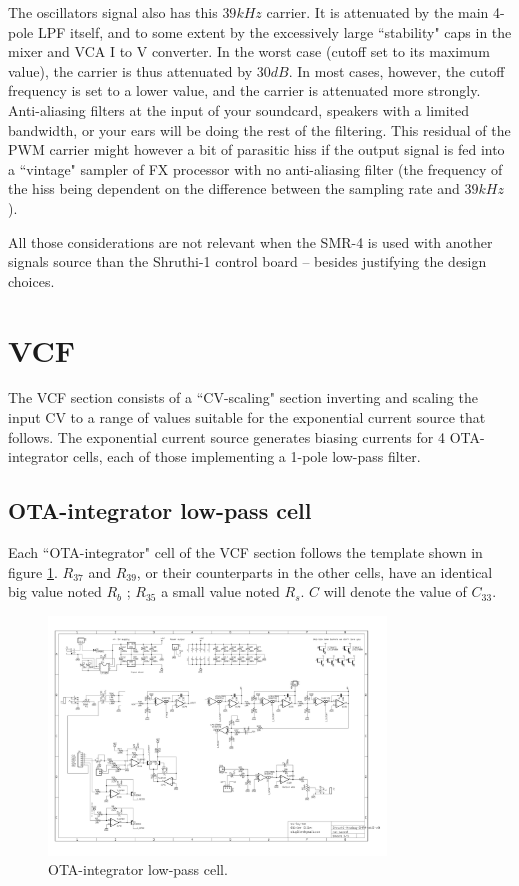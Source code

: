 \documentclass[a4paper,11pt]{article}
\begin{document}
The oscillators signal also has this $39kHz$ carrier. It is attenuated by the main 4-pole LPF itself, and to some extent by the excessively large ``stability" caps in the mixer and VCA I to V converter. In the worst case (cutoff set to its maximum value), the carrier is thus attenuated by $30dB$. In most cases, however, the cutoff frequency is set to a lower value, and the carrier is attenuated more strongly. Anti-aliasing filters at the input of your soundcard, speakers with a limited bandwidth, or your ears will be doing the rest of the filtering. This residual of the PWM carrier might however a bit of parasitic hiss if the output signal is fed into a ``vintage" sampler of FX processor with no anti-aliasing filter (the frequency of the hiss being dependent on the difference between the sampling rate and $39kHz$).

All those considerations are not relevant when the SMR-4 is used with another signals source than the Shruthi-1 control board -- besides justifying the design choices.

\section{VCF}
\label{sec:vcf}

The VCF section consists of a ``CV-scaling" section inverting and scaling the input CV to a range of values suitable for the exponential current source that follows. The exponential current source generates biasing currents for 4 OTA-integrator cells, each of those implementing a 1-pole low-pass filter.

\subsection{OTA-integrator low-pass cell}
\label{sec:otac}

Each ``OTA-integrator" cell of the VCF section follows the template shown in figure \ref{fig:otac}. $R_{37}$ and $R_{39}$, or their counterparts in the other cells, have an identical big value noted $R_b$ ; $R_{35}$ a small value noted $R_s$. $C$ will denote the value of $C_{33}$.

\begin{figure}
\centering
\includegraphics[width=0.8\textwidth]{smr4mkII_otac_cell.pdf}
\caption{OTA-integrator low-pass cell.}
\label{fig:otac}
\end{figure}
\end{document}
